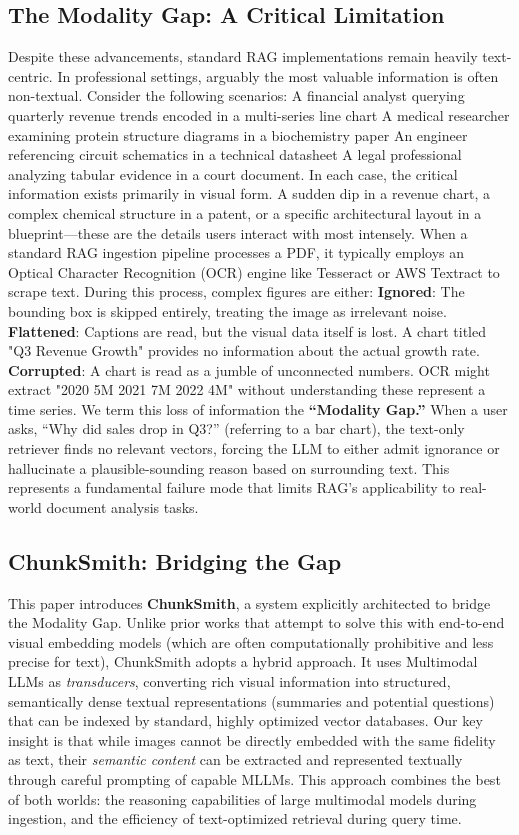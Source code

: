 \documentclass[conference]{IEEEtran}
\begin{document}
\subsection{The Modality Gap: A Critical Limitation}
Despite these advancements, standard RAG implementations remain heavily text-centric. In professional settings, arguably the most valuable information is often non-textual. Consider the following scenarios:
A financial analyst querying quarterly revenue trends encoded in a multi-series line chart
A medical researcher examining protein structure diagrams in a biochemistry paper
An engineer referencing circuit schematics in a technical datasheet
A legal professional analyzing tabular evidence in a court document. In each case, the critical information exists primarily in visual form. A sudden dip in a revenue chart, a complex chemical structure in a patent, or a specific architectural layout in a blueprint—these are the details users interact with most intensely.
When a standard RAG ingestion pipeline processes a PDF, it typically employs an Optical Character Recognition (OCR) engine like Tesseract or AWS Textract to scrape text. During this process, complex figures are either:
\textbf{Ignored}: The bounding box is skipped entirely, treating the image as irrelevant noise.
\textbf{Flattened}: Captions are read, but the visual data itself is lost. A chart titled "Q3 Revenue Growth" provides no information about the actual growth rate.
\textbf{Corrupted}: A chart is read as a jumble of unconnected numbers. OCR might extract "2020 5M 2021 7M 2022 4M" without understanding these represent a time series. We term this loss of information the \textbf{``Modality Gap.''} When a user asks, ``Why did sales drop in Q3?'' (referring to a bar chart), the text-only retriever finds no relevant vectors, forcing the LLM to either admit ignorance or hallucinate a plausible-sounding reason based on surrounding text. This represents a fundamental failure mode that limits RAG's applicability to real-world document analysis tasks.
\subsection{ChunkSmith: Bridging the Gap}
This paper introduces \textbf{ChunkSmith}, a system explicitly architected to bridge the Modality Gap. Unlike prior works that attempt to solve this with end-to-end visual embedding models (which are often computationally prohibitive and less precise for text), ChunkSmith adopts a hybrid approach. It uses Multimodal LLMs as \textit{transducers}, converting rich visual information into structured, semantically dense textual representations (summaries and potential questions) that can be indexed by standard, highly optimized vector databases.
Our key insight is that while images cannot be directly embedded with the same fidelity as text, their \textit{semantic content} can be extracted and represented textually through careful prompting of capable MLLMs. This approach combines the best of both worlds: the reasoning capabilities of large multimodal models during ingestion, and the efficiency of text-optimized retrieval during query time.
\end{document}
